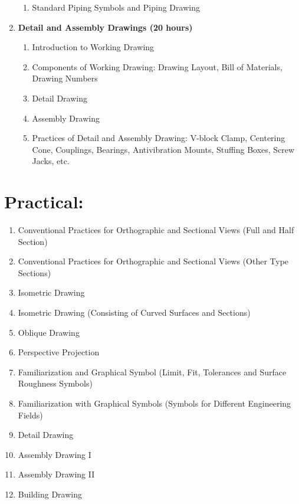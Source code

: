 \begin{enumerate}
\begin{enumerate}
        \item Standard Piping Symbols and Piping Drawing
    \end{enumerate}
    
    \item \textbf{ Detail and Assembly Drawings \hfill (20 hours) }
    \begin{enumerate}
        \item Introduction to Working Drawing
        \item Components of Working Drawing: Drawing Layout, Bill of Materials, Drawing Numbers
        \item Detail Drawing
        \item Assembly Drawing
        \item Practices of Detail and Assembly Drawing: V-block Clamp, Centering Cone, Couplings, Bearings, Antivibration Mounts, Stuffing Boxes, Screw Jacks, etc.
    \end{enumerate}
\end{enumerate}


\section*{Practical:}
\begin{enumerate}
    \item Conventional Practices for Orthographic and Sectional Views (Full and Half Section)
    \item Conventional Practices for Orthographic and Sectional Views (Other Type Sections)
    \item Isometric Drawing
    \item Isometric Drawing (Consisting of Curved Surfaces and Sections)
    \item Oblique Drawing
    \item Perspective Projection
    \item Familiarization and Graphical Symbol (Limit, Fit, Tolerances and Surface Roughness Symbols)
    \item Familiarization with Graphical Symbols (Symbols for Different Engineering Fields)
    \item Detail Drawing
    \item Assembly Drawing I
    \item Assembly Drawing II
    \item Building Drawing
\end{enumerate}




